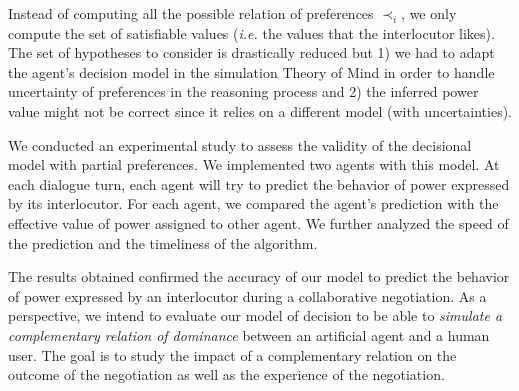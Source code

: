 \documentclass[sigconf]{aamas}  %
\begin{document}
		Instead of computing all the possible relation of preferences $\prec_i$, we only compute the set of satisfiable values (\emph{i.e.} the values that the interlocutor likes). The set of hypotheses to consider is drastically reduced but 1) we had to adapt the agent's decision model in the simulation Theory of Mind in order to handle uncertainty of preferences in the reasoning process and 2) the inferred power value might not be correct since it relies on a different model (with uncertainties). 
		
		We conducted an experimental study to assess the validity of the decisional model with partial preferences. We implemented two agents with this model. At each dialogue turn, each agent will try to predict the behavior of power expressed by its interlocutor. For each agent, we compared the agent's prediction with the effective value of power assigned to other agent. We further analyzed the speed of the prediction and the timeliness of the algorithm. 
		
		The results obtained confirmed the accuracy of our model to predict the behavior of power expressed by an interlocutor during a collaborative negotiation.  As a perspective, we intend to evaluate our model of decision to be able to \emph{simulate a complementary relation of dominance} between an artificial agent and a human user. The goal is to study the impact of a complementary relation on the outcome of the negotiation as well as the experience of the negotiation.

	
	
	
\end{document}
